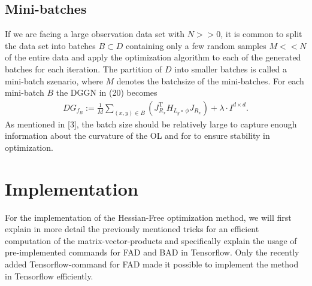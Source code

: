 \documentclass[conference]{IEEEtran}
\begin{document}
\subsection{Mini-batches}
\noindent
If we are facing a large observation data set with $N>>0$, it is common to split the data set into batches $B\subset D$ containing only a few random samples $M<<N$ of the entire data and apply the optimization algorithm to each of the generated batches for each iteration. The partition of $D$ into smaller batches is called a mini-batch szenario, where $M$ denotes the batchsize of the mini-batches. For each mini-batch $B$ the DGGN in (20) becomes
\begin{align}
DG_{f_{B}} := \frac{1}{M}\sum_{(x, y)\in B}^{}\left(J_{R_{x}}^{\mathrm{T}}H_{L_{y}\circ\:\phi}J_{R_{x}}\right) + \lambda\cdot I^{d\times d}.
\end{align}
As mentioned in [3], the batch size should be relatively large to capture enough information about the curvature of the OL and for to ensure stability in optimization. 



\section {Implementation}
\noindent
For the implementation of the Hessian-Free optimization method, we will first explain in more detail the previously mentioned tricks for an efficient computation of the matrix-vector-products and specifically explain the usage of pre-implemented commands for FAD and BAD in Tensorflow. Only the recently added Tensorflow-command for FAD made it possible to implement the method in Tensorflow efficiently.
\end{document}
